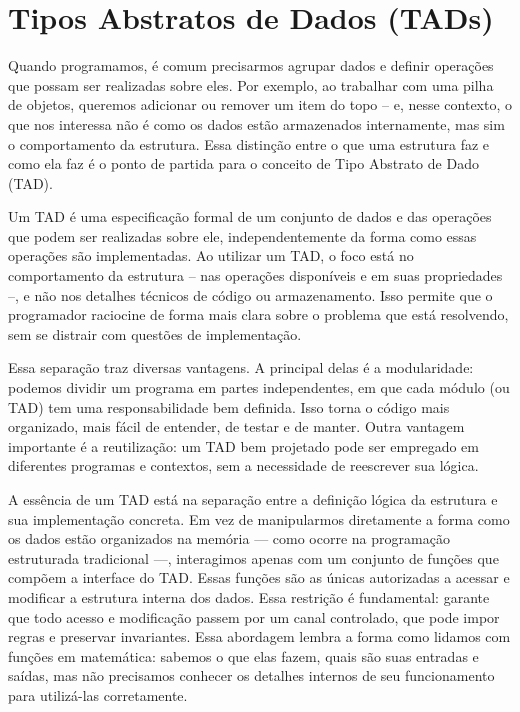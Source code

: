 \chapter{Tipos Abstratos de Dados (TADs)}

Quando programamos, é comum precisarmos agrupar dados e definir operações que possam ser realizadas sobre eles. 
Por exemplo, ao trabalhar com uma pilha de objetos, queremos adicionar ou remover um item do topo -- e, nesse contexto, o que nos interessa não é como os dados estão armazenados internamente, mas sim o comportamento da estrutura. 
Essa distinção entre o que uma estrutura faz e como ela faz é o ponto de partida para o conceito de Tipo Abstrato de Dado (TAD).

Um TAD é uma especificação formal de um conjunto de dados e das operações que podem ser realizadas sobre ele, independentemente da forma como essas operações são implementadas. 
Ao utilizar um TAD, o foco está no comportamento da estrutura -- nas operações disponíveis e em suas propriedades --, e não nos detalhes técnicos de código ou armazenamento. 
Isso permite que o programador raciocine de forma mais clara sobre o problema que está resolvendo, sem se distrair com questões de implementação.

Essa separação traz diversas vantagens. 
A principal delas é a modularidade: podemos dividir um programa em partes independentes, em que cada módulo (ou TAD) tem uma responsabilidade bem definida. Isso torna o código mais organizado, mais fácil de entender, de testar e de manter. 
Outra vantagem importante é a reutilização: um TAD bem projetado pode ser empregado em diferentes programas e contextos, sem a necessidade de reescrever sua lógica.

A essência de um TAD está na separação entre a definição lógica da estrutura e sua implementação concreta. 
Em vez de manipularmos diretamente a forma como os dados estão organizados na memória — como ocorre na programação estruturada tradicional —, interagimos apenas com um conjunto de funções que compõem a interface do TAD. 
Essas funções são as únicas autorizadas a acessar e modificar a estrutura interna dos dados. 
Essa restrição é fundamental: garante que todo acesso e modificação passem por um canal controlado, que pode impor regras e preservar invariantes. 
Essa abordagem lembra a forma como lidamos com funções em matemática: sabemos o que elas fazem, quais são suas entradas e saídas, mas não precisamos conhecer os detalhes internos de seu funcionamento para utilizá-las corretamente.

